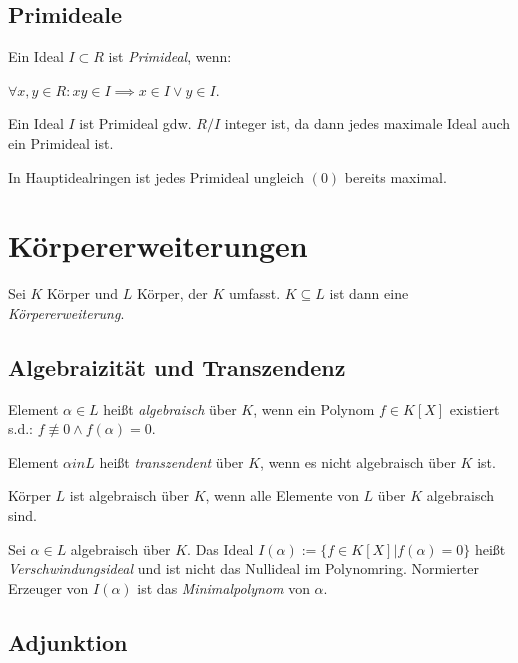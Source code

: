\subsection*{Primideale}

Ein Ideal $I \subset R$ ist \emph{Primideal}, wenn:

$\forall x, y \in R : xy \in I \implies x \in I \lor y \in I$.

\vspace*{1mm}

Ein Ideal $I$ ist Primideal gdw. $R/I$ integer ist, da dann jedes maximale Ideal auch ein Primideal ist.

\vspace*{1mm}

In Hauptidealringen ist jedes Primideal ungleich $(0)$ bereits maximal.

\section*{Körpererweiterungen}

Sei $K$ Körper und $L$ Körper, der $K$ umfasst. $K \subseteq L$ ist dann eine \emph{Körpererweiterung}.

\subsection*{Algebraizität und Transzendenz}

Element $\alpha \in L$ heißt \emph{algebraisch} über $K$, wenn ein Polynom $f \in K[X]$ existiert s.d.: $f \not\equiv 0 \land f(\alpha) = 0$.

\vspace*{1mm}

Element $\alpha in L$ heißt \emph{transzendent} über $K$, wenn es nicht algebraisch über $K$ ist.

\vspace*{1mm}

Körper $L$ ist algebraisch über $K$, wenn alle Elemente von $L$ über $K$ algebraisch sind.

\vspace*{1mm}

Sei $\alpha \in L$ algebraisch über $K$. Das Ideal $I(\alpha) := \{f \in K[X] | f(\alpha) = 0\}$ heißt \emph{Verschwindungsideal} und ist nicht das Nullideal im Polynomring. Normierter Erzeuger von $I(\alpha)$ ist das \emph{Minimalpolynom} von $\alpha$.

\subsection*{Adjunktion}

